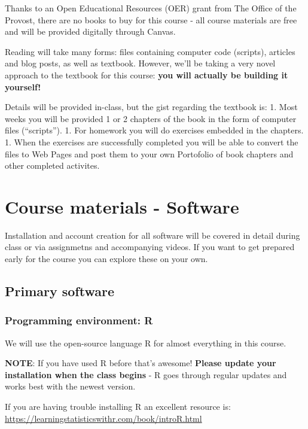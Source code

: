 \documentclass[
]{book}
\begin{document}
Thanks to an Open Educational Resources (OER) grant from The Office of the Provost, there are no books to buy for this course - all course materials are free and will be provided digitally through Canvas.

Reading will take many forms: files containing computer code (scripts), articles and blog posts, as well as textbook. However, we'll be taking a very novel approach to the textbook for this course: \textbf{you will actually be building it yourself!}

Details will be provided in-class, but the gist regarding the textbook is:
1. Most weeks you will be provided 1 or 2 chapters of the book in the form of computer files (``scripts'').
1. For homework you will do exercises embedded in the chapters.
1. When the exercises are successfully completed you will be able to convert the files to Web Pages and post them to your own Portofolio of book chapters and other completed activites.

\hypertarget{course-materials---software}{%
\chapter{Course materials - Software}\label{course-materials---software}}

Installation and account creation for all software will be covered in detail during class or via assignmetns and accompanying videos. If you want to get prepared early for the course you can explore these on your own.

\hypertarget{primary-software}{%
\section{Primary software}\label{primary-software}}

\hypertarget{programming-environment-r}{%
\subsection{Programming environment: R}\label{programming-environment-r}}

We will use the open-source language R for almost everything in this course.

\textbf{NOTE}: If you have used R before that's awesome! \textbf{Please update your installation when the class begins} - R goes through regular updates and works best with the newest version.

If you are having trouble installing R an excellent resource is:
\url{https://learningstatisticswithr.com/book/introR.html}
\end{document}
